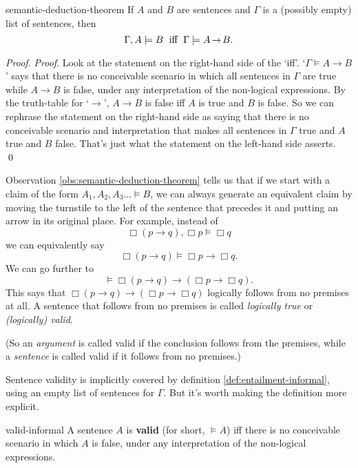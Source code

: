 \begin{observation}{semantic-deduction-theorem}
  If $A$ and $B$ are sentences and $\Gamma$ is a (possibly empty) list of sentences, then
  \vspace{-1mm}
  \[
    \Gamma,A \models B \text{ \;iff\; }\Gamma \models A \to B.
  \]
  \vspace{-5mm}
\end{observation}
%
\begin{proof}
  \emph{Proof}. Look at the statement on the right-hand side of the `iff'.
  `$\Gamma \models A \to B$' says that there is no conceivable scenario in which
  all sentences in $\Gamma$ are true while $A\to B$ is false, under any
  interpretation of the non-logical expressions. By the truth-table for `$\to$',
  $A\to B$ is false iff $A$ is true and $B$ is false. So we can rephrase the
  statement on the right-hand side as saying that there is no conceivable
  scenario and interpretation that makes all sentences in $\Gamma$ true and
  $A$ true and $B$ false. That's just what the statement on the left-hand
  side asserts. \qed
\end{proof}

Observation \ref{obs:semantic-deduction-theorem} tells us that if we start with
a claim of the form $A_{1},A_{2},A_{3}\ldots \models B$, we can always generate
an equivalent claim by moving the turnstile to the left of the sentence that
precedes it and putting an arrow in its original place. For example, instead of
\begin{equation*}
  \Box (p \to q), \Box p \models \Box q
\end{equation*}
we can equivalently say
\begin{equation*}
  \Box (p \to q) \models \Box p \to \Box q.
\end{equation*}
We can go further to
\begin{equation*}
  \models \Box (p \to q) \to (\Box p \to \Box q).
\end{equation*}
This says that $\Box (p \to q) \to (\Box p \to \Box q)$ logically follows from
no premises at all. A sentence that follows from no premises is called
\emph{logically true} or \emph{(logically) valid}.

(So an \emph{argument} is called valid if the conclusion follows from the
premises, while a \emph{sentence} is called valid if it follows from no
premises.)

Sentence validity is implicitly covered by definition
\ref{def:entailment-informal}, using an empty list of sentences for $\Gamma$.
But it's worth making the definition more explicit.
%
\begin{definition}{}{valid-informal}
  A sentence $A$ is \textbf{valid} (for short, $\models A$) iff there is no
  conceivable scenario in which $A$ is false, under any interpretation of the
  non-logical expressions.
\end{definition}

